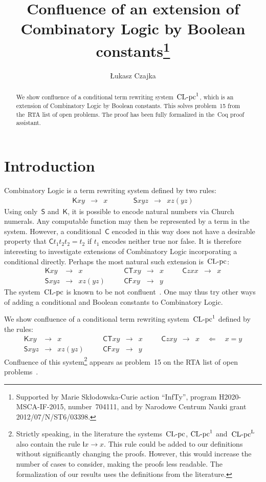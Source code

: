 \documentclass[a4paper,UKenglish]{lipics-v2016}
\title{Confluence of an extension of Combinatory Logic by Boolean
  constants\footnote{Supported by Marie Sk{\l}odowska-Curie action ``InfTy'',
    program H2020-MSCA-IF-2015, number~704111, and by Narodowe Centrum
    Nauki grant 2012/07/N/ST6/03398.}}
\author[1]{{\L}ukasz Czajka}
\affil[1]{DIKU, University of Copenhagen, Copenhagen, Denmark\\
  \texttt{luta@di.ku.dk}}
\newcommand{\Cs}{\mathsf{C}}
\newcommand{\Fs}{\mathsf{F}}
\newcommand{\Ts}{\mathsf{T}}
\newcommand{\Ss}{\mathsf{S}}
\newcommand{\Ks}{\mathsf{K}}
\newcommand{\Is}{\mathsf{I}}
\newcommand{\From}{\ensuremath{\Leftarrow}}
\newcommand{\CLC}{{\mbox{${\text{\rm CL-pc}^1}$}}}
\newcommand{\CLCz}{{\mbox{$\text{\rm CL-pc}$}}}
\newcommand{\CLCp}{{\mbox{$\text{\rm CL-pc}^{\mathrm{L}}$}}}
\begin{document}
\maketitle

\begin{abstract}
  We show confluence of a conditional term rewriting system~$\CLC$,
  which is an extension of Combinatory Logic by Boolean
  constants. This solves problem~15 from the~RTA list of open
  problems. The proof has been fully formalized in the~Coq proof
  assistant.
\end{abstract}

\section{Introduction}

Combinatory Logic is a term rewriting system defined by two rules:
\[
\begin{array}{rclcrcl}
  \Ks x y &\to& x &\quad\quad& \Ss x y z &\to& x z (y z)
\end{array}
\]
Using only~$\Ss$ and~$\Ks$, it is possible to encode natural numbers via
Church numerals. Any computable function may then be represented by a
term in the system. However, a conditional~$\Cs$ encoded in this way
does not have a desirable property that $\Cs t_1 t_2 t_2 = t_2$ if $t_1$
encodes neither true nor false. It is therefore interesting to
investigate extensions of Combinatory Logic incorporating a
conditional directly. Perhaps the most natural such extension
is~$\CLCz$:
\[
\begin{array}{rclcrclcrcl}
  \Ks x y &\to& x &\quad& \Cs \Ts x y &\to& x &\quad& \Cs z x x &\to& x\\
  \Ss x y z &\to& x z (y z) &\quad& \Cs \Fs x y &\to& y &&&&
\end{array}
\]
The system~$\CLCz$ is known to be not confluent~\cite{Klop1980}. One
may thus try other ways of adding a conditional and Boolean constants
to Combinatory Logic.

We show confluence of a conditional term rewriting system~$\CLC$
defined by the rules:
\[
\begin{array}{rclcrclcrcl}
  \Ks x y &\to& x &\quad& \Cs \Ts x y &\to& x &\quad& \Cs z x y &\to& x
  \quad\From\quad x = y\\
  \Ss x y z &\to& x z (y z) &\quad& \Cs \Fs x y &\to& y &&&&
\end{array}
\]
Confluence of this system\footnote{Strictly speaking, in the
  literature the systems~$\CLCz$, $\CLC$ and~$\CLCp$ also contain the
  rule $\Is x \to x$. This rule could be added to our definitions
  without significantly changing the proofs. However, this would
  increase the number of cases to consider, making the proofs less
  readable. The formalization of our results uses the definitions from
  the literature.} appears as problem~15 on the RTA list of open
problems~\cite{DershowitzJouannaudKlop1991}.
\end{document}
